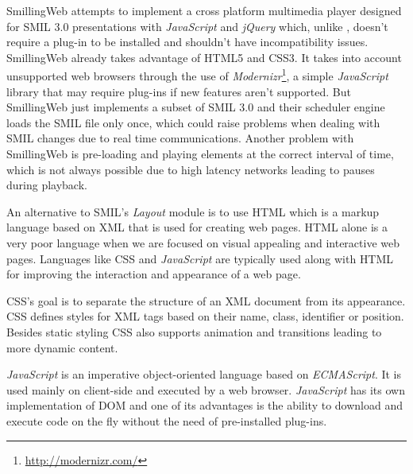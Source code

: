   SmillingWeb \cite{smillingweb} attempts to implement a cross platform multimedia player designed for \ac{SMIL} 3.0 presentations with \emph{JavaScript} and \emph{jQuery} which, unlike \cite{ambulant}, doesn't require a plug-in to be installed and shouldn't have incompatibility issues. 
  SmillingWeb already takes advantage of \ac{HTML}5 and \ac{CSS}3.
  It takes into account unsupported web browsers through the use of \emph{Modernizr}\footnote{\url{http://modernizr.com/}}, a simple \emph{JavaScript} library that may require plug-ins if new features aren't supported.  
  But SmillingWeb just implements a subset of \ac{SMIL} 3.0 and their scheduler engine loads the \ac{SMIL} file only once, which could raise problems when dealing with \ac{SMIL} changes due to real time communications.
  Another problem with SmillingWeb is pre-loading and playing elements at the correct interval of time, which is not always possible due to high latency networks leading to  pauses during playback.


  An alternative to \ac{SMIL}'s \emph{Layout} module is to use \ac{HTML} which is a markup language based on \ac{XML} that is used for creating web pages. \ac{HTML} alone is a very poor language when we are focused on visual appealing and interactive web pages. Languages like \ac{CSS} and \emph{JavaScript} are typically used along with \ac{HTML} for improving the interaction and appearance of a web page. 

  \ac{CSS}'s goal is to separate the structure of an \ac{XML} document from its appearance. \ac{CSS} defines styles for \ac{XML} tags based on their name, class, identifier or position.
  Besides static styling \ac{CSS} also supports animation and transitions leading to more dynamic content.

  \emph{JavaScript} is an imperative object-oriented language based on \emph{ECMAScript}. It is used mainly on client-side and executed by a web browser. \emph{JavaScript} has its own implementation of \ac{DOM} and one of its advantages is the ability to download and execute code on the fly without the need of pre-installed plug-ins.

